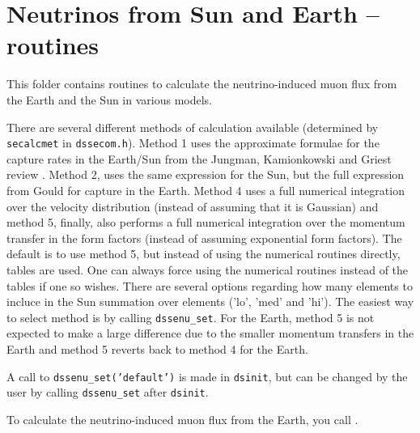 \section{Neutrinos from Sun and Earth --  routines}

This folder contains routines to calculate the
neutrino-induced muon flux from the Earth and the Sun in various
models. 

There are several different methods of calculation available (determined
by \texttt{secalcmet} in \texttt{dssecom.h}). Method 1 uses the
approximate formulae for the capture rates in the Earth/Sun from the
Jungman, Kamionkowski and Griest review \cite{Jungman:1995df}. Method 2, uses the
same expression for the Sun, but the full expression from Gould
\cite{Gould:1987ir} for capture in the Earth. Method 4 uses a full numerical integration over the velocity distribution (instead of assuming that it is Gaussian) and method 5, finally, also performs a full numerical integration over the momentum transfer in the form factors (instead of assuming exponential form factors). The default is to use method 5, but instead of using the numerical routines directly, tables are used. One can always force using the numerical routines instead of the tables if one so wishes. There are several options regarding how many elements to incluce in the Sun summation over elements ('lo', 'med' and 'hi').
The easiest way to select method is by
calling \texttt{dssenu\_set}. For the Earth, method 5 is not expected to make a large difference due to the smaller momentum transfers in the Earth and method 5 reverts back to method 4 for the Earth.

A call to 
\texttt{dssenu\_set('default')} is made in \texttt{dsinit}, but can be
changed by the user by calling \texttt{dssenu\_set} after \texttt{dsinit}.

To calculate the neutrino-induced muon flux from the Earth, you call
. 
